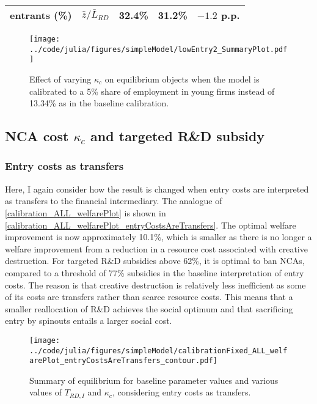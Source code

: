\documentclass[ecta,nameyear,draft]{econsocart}
\theoremstyle{plain}
\theoremstyle{remark}
\begin{document}
\begin{appendix}
\begin{table}[]
\begin{tabular}{lclll}
		\multicolumn{1}{l}{\quad entrants (\%)}  & $\hat{z} / \bar{L}_{RD}$ & 32.4\% & 31.2\% & $-1.2$ p.p. \tabularnewline
		\bottomrule
	\end{tabular}
\end{table}


\begin{figure}[]
	\centering
	\texttt{[image: ../code/julia/figures/simpleModel/lowEntry2\_SummaryPlot.pdf]}
	\caption{Effect of varying $\kappa_c$ on equilibrium objects when the model is calibrated to a 5\% share of employment in young firms instead of 13.34\% as in the baseline calibration.}
	\label{calibration_lowEntry_summaryPlot}
\end{figure}


\clearpage
\subsection{NCA cost $\kappa_c$ and targeted R\&D subsidy}\label{appendix:policyanalysis:allpolicies}

\subsubsection{Entry costs as transfers}

Here, I again consider how the result is changed when entry costs are interpreted as transfers to the financial intermediary. The analogue of \autoref{calibration_ALL_welfarePlot} is shown in \autoref{calibration_ALL_welfarePlot_entryCostsAreTransfers}. The optimal welfare improvement is now approximately 10.1\%, which is smaller as there is no longer a welfare improvement from a reduction in a resource cost associated with creative destruction. For targeted R\&D subsidies above 62\%, it is optimal to ban NCAs, compared to a threshold of 77\% subsidies in the baseline interpretation of entry costs. The reason is that creative destruction is relatively less inefficient as some of its costs are transfers rather than scarce resource costs. This means that a smaller reallocation of R\&D achieves the social optimum and that sacrificing entry by spinouts entails a larger social cost. 

\begin{figure}[]
	\centering
	\texttt{[image: ../code/julia/figures/simpleModel/calibrationFixed\_ALL\_welfarePlot\_entryCostsAreTransfers\_contour.pdf]}
	\caption{Summary of equilibrium for baseline parameter values and various values of $T_{RD,I}$ and $\kappa_c$, considering entry costs as transfers.}
	\label{calibration_ALL_welfarePlot_entryCostsAreTransfers}
\end{figure}

\end{appendix}

\clearpage




\end{document}
